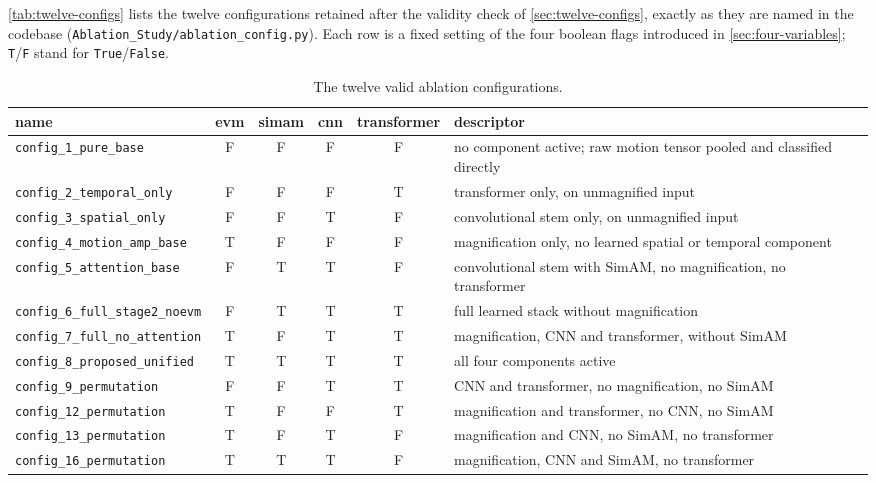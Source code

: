 \autoref{tab:twelve-configs} lists the twelve configurations retained after the validity check of \autoref{sec:twelve-configs}, exactly as they are named in the codebase (\texttt{Ablation\_Study/ablation\_config.py}). Each row is a fixed setting of the four boolean flags introduced in \autoref{sec:four-variables}; \texttt{T}/\texttt{F} stand for \texttt{True}/\texttt{False}.

\begin{table}[htbp]
	\centering
	\footnotesize
	\begin{tabular}{p{3.3cm} c c c c p{5.0cm}}
		\hline
		\textbf{name} & \textbf{evm} & \textbf{simam} & \textbf{cnn} & \textbf{transformer} & \textbf{descriptor} \\
		\hline
		\texttt{config\_1\_pure\_base}        & F & F & F & F & no component active; raw motion tensor pooled and classified directly \\
		\texttt{config\_2\_temporal\_only}    & F & F & F & T & transformer only, on unmagnified input \\
		\texttt{config\_3\_spatial\_only}     & F & F & T & F & convolutional stem only, on unmagnified input \\
		\texttt{config\_4\_motion\_amp\_base} & T & F & F & F & magnification only, no learned spatial or temporal component \\
		\texttt{config\_5\_attention\_base}   & F & T & T & F & convolutional stem with SimAM, no magnification, no transformer \\
		\texttt{config\_6\_full\_stage2\_noevm} & F & T & T & T & full learned stack without magnification \\
		\texttt{config\_7\_full\_no\_attention} & T & F & T & T & magnification, CNN and transformer, without SimAM \\
		\texttt{config\_8\_proposed\_unified} & T & T & T & T & all four components active \\
		\texttt{config\_9\_permutation}       & F & F & T & T & CNN and transformer, no magnification, no SimAM \\
		\texttt{config\_12\_permutation}      & T & F & F & T & magnification and transformer, no CNN, no SimAM \\
		\texttt{config\_13\_permutation}      & T & F & T & F & magnification and CNN, no SimAM, no transformer \\
		\texttt{config\_16\_permutation}      & T & T & T & F & magnification, CNN and SimAM, no transformer \\
		\hline
	\end{tabular}
	\caption[The twelve valid ablation configurations]{The twelve valid ablation configurations.}
	\label{tab:twelve-configs}
\end{table}

